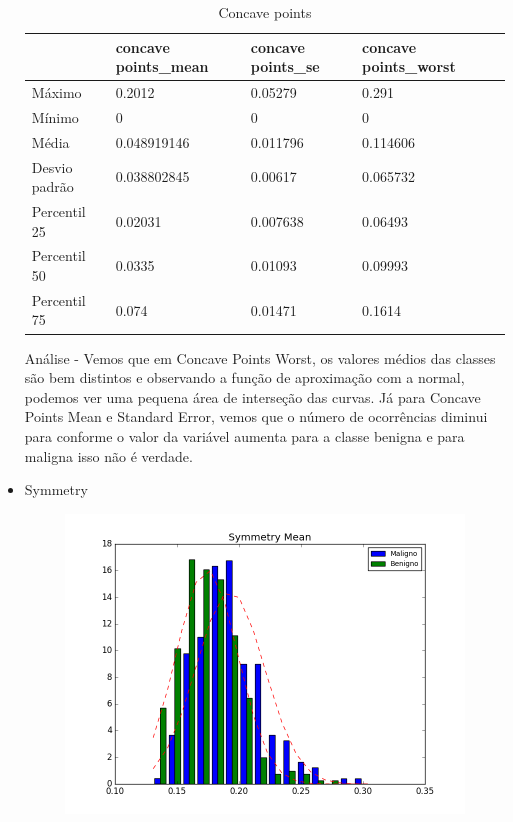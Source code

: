 \documentclass[11pt,a4paper]{article}
\numberwithin{equation}{section}
\begin{document}
\begin{itemize}
\begin{table}[H]
\centering
\caption{Concave points}
\label{my-label}
\begin{tabular}{lllll} \hline
              & concave points\_mean & concave points\_se & concave points\_worst &  \\ \hline
Máximo        & 0.2012               & 0.05279            & 0.291                 &  \\
Mínimo        & 0                    & 0                  & 0                     &  \\
Média         & 0.048919146          & 0.011796           & 0.114606              &  \\
Desvio padrão & 0.038802845          & 0.00617            & 0.065732              &  \\
Percentil 25  & 0.02031              & 0.007638           & 0.06493               &  \\
Percentil 50  & 0.0335               & 0.01093            & 0.09993               &  \\
Percentil 75  & 0.074                & 0.01471            & 0.1614                &  \\ \hline
\end{tabular}
\end{table}

Análise - Vemos que em Concave Points Worst, os valores médios das classes são bem distintos e observando a função de aproximação com a normal, podemos ver uma pequena área de interseção das curvas. Já para Concave Points Mean e Standard Error, vemos que o número de ocorrências diminui para conforme o valor da variável aumenta para a classe benigna e para maligna isso não é verdade.

\item Symmetry
\begin{figure}[H]
\centering
  \includegraphics[width=.5\linewidth]{../img/hist/symmetry_mean}
  \label{fig:test1}
\end{figure}%


\end{itemize}
\end{document}

